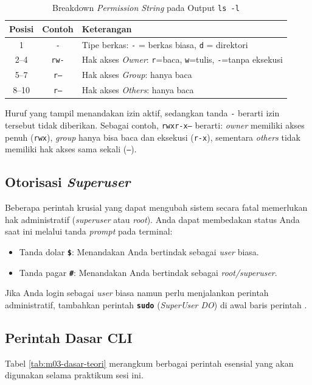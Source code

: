 \begin{table}[H]
	\caption{Breakdown \textit{Permission String} pada Output \texttt{ls -l}}
	\label{tab:ls-l-breakdown}
	\small
	\begin{tabularx}{\textwidth}{|c|c|X|}
		\hline
		\textbf{Posisi} & \textbf{Contoh} & \textbf{Keterangan} \\ \hline
		1               & \texttt{-}      & Tipe berkas: \texttt{-} = berkas biasa, \texttt{d} = direktori \\ \hline
		2--4            & \texttt{rw-}    & Hak akses \textit{Owner}: \texttt{r}=baca, \texttt{w}=tulis, \texttt{-}=tanpa eksekusi \\ \hline
		5--7            & \texttt{r--}    & Hak akses \textit{Group}: hanya baca \\ \hline
		8--10           & \texttt{r--}    & Hak akses \textit{Others}: hanya baca \\ \hline
	\end{tabularx}
\end{table}

Huruf yang tampil menandakan izin aktif, sedangkan tanda \texttt{-} berarti izin tersebut tidak diberikan. Sebagai contoh, \texttt{rwxr-x---} berarti: \textit{owner} memiliki akses penuh (\texttt{rwx}), \textit{group} hanya bisa baca dan eksekusi (\texttt{r-x}), sementara \textit{others} tidak memiliki hak akses sama sekali (\texttt{---}).

\subsection{Otorisasi \textit{Superuser}}
Beberapa perintah krusial yang dapat mengubah sistem secara fatal memerlukan hak administratif (\textit{superuser} atau \textit{root}). Anda dapat membedakan status Anda saat ini melalui tanda \textit{prompt} pada terminal:
\begin{itemize}
	\item Tanda dolar \textbf{\texttt{\$}}: Menandakan Anda bertindak sebagai \textit{user} biasa.
	\item Tanda pagar \textbf{\texttt{\#}}: Menandakan Anda bertindak sebagai \textit{root/superuser}.
\end{itemize}
Jika Anda login sebagai \textit{user} biasa namun perlu menjalankan perintah administratif, tambahkan perintah \textbf{\texttt{sudo}} (\textit{SuperUser DO}) di awal baris perintah \cite{shotts2019linux}.

\subsection{Perintah Dasar CLI}
Tabel \ref{tab:m03-dasar-teori} merangkum berbagai perintah esensial yang akan digunakan selama praktikum sesi ini.


